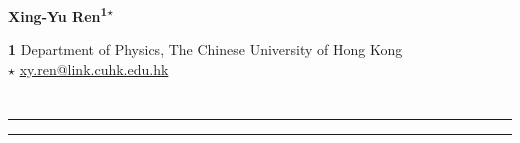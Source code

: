 \documentclass{SciPost}
\begin{document}
\pagestyle{SPstyle}

\begin{center}{\Large \textbf{\color{scipostdeepblue}{
SptSet GAP Library Introduction
}}}\end{center}

\begin{center}\textbf{
Xing-Yu Ren\textsuperscript{1$\star$}
}\end{center}

\begin{center}
{\bf 1} Department of Physics, The Chinese University of Hong Kong
\\ [\baselineskip]
$\star$ \href{mailto:xy.ren@link.cuhk.edu.hk}{\small xy.ren@link.cuhk.edu.hk}\
\end{center}


\section*{\color{scipostdeepblue}{Abstract}}
\textbf{}



\linenumbers

\vspace{10pt}
\noindent\rule{\textwidth}{1pt}
\tableofcontents
\noindent\rule{\textwidth}{1pt}
\vspace{10pt}


\end{document}
